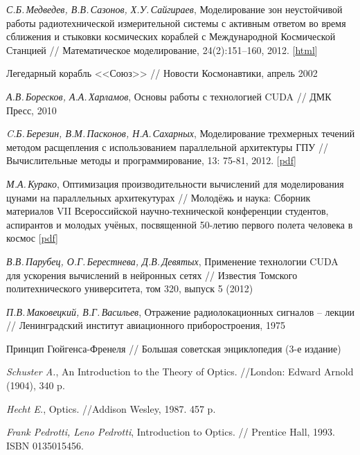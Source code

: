 \newpage
\begin{thebibliography}{99}

  \textit{С.Б.\,Медведев, В.В.\,Сазонов, Х.У.\,Сайгираев}, Моделирование зон неустойчивой работы радиотехнической измерительной системы с активным ответом во время сближения и стыковки космических кораблей с Международной Космической Станцией
  // Математическое моделирование, 24(2):151–160, 2012.
  [\href{http://istina.imec.msu.ru/publications/article/533721/}{html}]

  Легедарный корабль <<Союз>>
  // Новости Космонавтики, апрель 2002


  \textit{А.В.\,Боресков, А.А.\,Харламов}, Основы работы с технологией CUDA
  // ДМК Пресс, 2010

  \textit{C.Б.\,Березин, В.М.\,Пасконов, Н.А.\,Сахарных}, Моделирование трехмерных течений методом расщепления с использованием параллельной архитектуры ГПУ
 // Вычислительные методы и программирование, 13: 75-81, 2012.
  [\href{http://num-meth.srcc.msu.ru/zhurnal/tom_2012/pdf/v13r210.pdf}{pdf}]

  \textit{М.А.\,Курако}, Оптимизация производительности вычислений для моделирования цунами на параллельных архитекутурах
  // Молодёжь и наука: Сборник материалов VII Всероссийской научно-технической конференции студентов, аспирантов и молодых учёных, посвященной 50-летию первого полета человека в космос
  [\href{http://elib.sfu-kras.ru/bitstream/2311/5869/1/s3_029.pdf}{pdf}]
  
  \textit{В.В.\,Парубец, О.Г.\,Берестнева, Д.В.\,Девятых}, Применение технологии CUDA для ускорения вычислений в нейронных сетях
  // Известия Томского политехнического университета, том 320, выпуск 5 (2012)

  \textit{П.В.\,Маковецкий, В.Г.\,Васильев}, Отражение радиолокационных сигналов -- лекции
  // Ленинградский институт авиационного приборостроения, 1975

  Принцип Гюйгенса-Френеля
  // Большая советская энциклопедия (3-е издание)

  \textit{Schuster A.}, An Introduction to the Theory of Optics. 
  //London: Edward Arnold (1904), 340 p.


  \textit{Hecht E.}, Optics. 
  //Addison Wesley, 1987. 457 p.


  \textit{Frank Pedrotti, Leno Pedrotti}, Introduction to Optics. 
  // Prentice Hall, 1993. ISBN 0135015456.  


\end{thebibliography}
